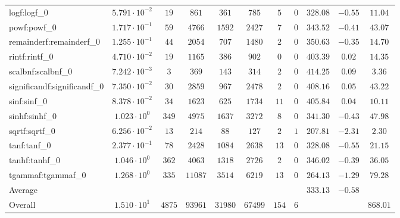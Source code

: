 \begin{tabular}{|l|c|c|c|c|c|c|c|c|c|c|}
logf:logf\_0                 & $ 5.791 \cdot 10^{-2} $ & $ 19     $ & $ 861   $ & $ 361   $ & $ 785   $ & $ 5   $ & $ 0 $ & $ 328.08      $ & $ -0.55   $ & $ 11.04   $ \\
powf:powf\_0                 & $ 1.717 \cdot 10^{-1} $ & $ 59     $ & $ 4766  $ & $ 1592  $ & $ 2427  $ & $ 7   $ & $ 0 $ & $ 343.52      $ & $ -0.41   $ & $ 43.07   $ \\
remainderf:remainderf\_0     & $ 1.255 \cdot 10^{-1} $ & $ 44     $ & $ 2054  $ & $ 707   $ & $ 1480  $ & $ 2   $ & $ 0 $ & $ 350.63      $ & $ -0.35   $ & $ 14.70   $ \\
rintf:rintf\_0               & $ 4.710 \cdot 10^{-2} $ & $ 19     $ & $ 1165  $ & $ 386   $ & $ 902   $ & $ 0   $ & $ 0 $ & $ 403.39      $ & $ 0.02    $ & $ 14.35   $ \\
scalbnf:scalbnf\_0           & $ 7.242 \cdot 10^{-3} $ & $ 3      $ & $ 369   $ & $ 143   $ & $ 314   $ & $ 2   $ & $ 0 $ & $ 414.25      $ & $ 0.09    $ & $ 3.36    $ \\
significandf:significandf\_0 & $ 7.350 \cdot 10^{-2} $ & $ 30     $ & $ 2859  $ & $ 967   $ & $ 2478  $ & $ 2   $ & $ 0 $ & $ 408.16      $ & $ 0.05    $ & $ 43.22   $ \\
sinf:sinf\_0                 & $ 8.378 \cdot 10^{-2} $ & $ 34     $ & $ 1623  $ & $ 625   $ & $ 1734  $ & $ 11  $ & $ 0 $ & $ 405.84      $ & $ 0.04    $ & $ 10.11   $ \\
sinhf:sinhf\_0               & $ 1.023 \cdot 10^{0}  $ & $ 349    $ & $ 4975  $ & $ 1637  $ & $ 3272  $ & $ 8   $ & $ 0 $ & $ 341.30      $ & $ -0.43   $ & $ 47.98   $ \\
sqrtf:sqrtf\_0               & $ 6.256 \cdot 10^{-2} $ & $ 13     $ & $ 214   $ & $ 88    $ & $ 127   $ & $ 2   $ & $ 1 $ & $ 207.81      $ & $ -2.31   $ & $ 2.30    $ \\
tanf:tanf\_0                 & $ 2.377 \cdot 10^{-1} $ & $ 78     $ & $ 2428  $ & $ 1084  $ & $ 2638  $ & $ 13  $ & $ 0 $ & $ 328.08      $ & $ -0.55   $ & $ 21.15   $ \\
tanhf:tanhf\_0               & $ 1.046 \cdot 10^{0}  $ & $ 362    $ & $ 4063  $ & $ 1318  $ & $ 2726  $ & $ 2   $ & $ 0 $ & $ 346.02      $ & $ -0.39   $ & $ 36.05   $ \\
tgammaf:tgammaf\_0           & $ 1.268 \cdot 10^{0}  $ & $ 335    $ & $ 11087 $ & $ 3514  $ & $ 6219  $ & $ 13  $ & $ 0 $ & $ 264.13      $ & $ -1.29   $ & $ 79.28   $ \\
\hline
Average                      & $                     $ & $        $ & $       $ & $       $ & $       $ & $     $ & $   $ & $ 333.13      $ & $ -0.58   $ & $         $ \\
\hline
Overall                      & $ 1.510 \cdot 10^{1}  $ & $ 4875   $ & $ 93961 $ & $ 31980 $ & $ 67499 $ & $ 154 $ & $ 6 $ & $             $ & $         $ & $ 868.01  $ \\
\hline
\end{tabular}
